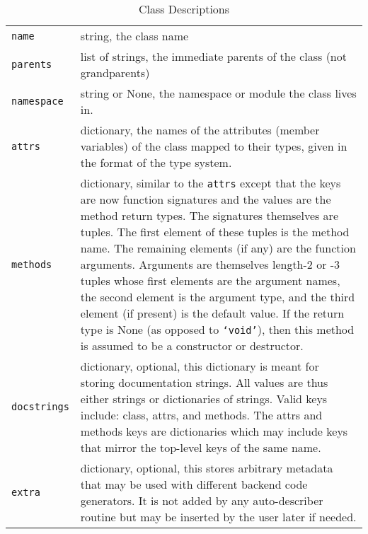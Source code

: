 \documentclass{ansconfpaper}
\newcommand{\vin}[1]{\texttt{{#1}}}
\begin{document}
\begin{table*}[htbp]
\begin{center}
\caption{Class Descriptions}
\label{classdesc}
\begin{tabular}{|lp{0.8\hsize}|}
\hline
\vin{name} & string, the class name \\
\vin{parents} & list of strings, the immediate parents of the class (not grandparents) \\
\vin{namespace} & string or None, the namespace or module the class lives in. \\
\vin{attrs} & dictionary, the names of the attributes (member variables) of the
    class mapped to their types, given in the format of the type system. \\
\vin{methods} & dictionary, similar to the \vin{attrs} except that the keys are now
    function signatures and the values are the method return types.  The signatures
    themselves are tuples. The first element of these tuples is the method name.
    The remaining elements (if any) are the function arguments.  Arguments are 
    themselves length-2 or -3 tuples whose first elements are the argument names, 
    the second element is the argument type, and the third element (if present) is
    the default value.  If the return type is None (as opposed to \vin{`void'}), then 
    this method is assumed to be a constructor or destructor. \\
\vin{docstrings} & dictionary, optional, this dictionary is meant for storing 
    documentation strings.  All values are thus either strings or dictionaries of 
    strings.   Valid keys include: class, attrs, and methods.  The attrs and methods
    keys are dictionaries which may include keys that mirror the top-level keys of
    the same name. \\
\vin{extra} & dictionary, optional, this stores arbitrary metadata that may be used 
    with different backend code generators. It is not added by any auto-describer
    routine but may be inserted by the user later if needed.\\
\hline
\end{tabular}
\end{center}
\end{table*}
\end{document}
